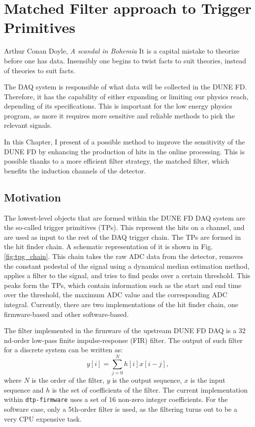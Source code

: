 \chapter{Matched Filter approach to Trigger Primitives}\label{chapter:matched_filter}

\begin{chapquote}{Arthur Conan Doyle, \textit{A scandal in Bohemia}}
	It is a capital mistake to theorize before one has data. Insensibly one begins to twist facts to suit theories, instead of theories to suit facts.
\end{chapquote}

The DAQ system is responsible of what data will be collected in the DUNE FD. Therefore, it has the capability of either expanding or limiting our physics reach, depending of its specifications. This is important for the low energy physics program, as more it requires more sensitive and reliable methods to pick the relevant signals.

In this Chapter, I present of a possible method to improve the sensitivity of the DUNE FD by enhancing the production of hits in the online processing. This is possible thanks to a more efficient filter strategy, the matched filter, which benefits the induction channels of the detector.

\section{Motivation}
\label{sec:matched_filter_motivation}

The lowest-level objects that are formed within the DUNE FD DAQ system are the so-called trigger primitives (TPs). This represent the hits on a channel, and are used as input to the rest of the DAQ trigger chain. The TPs are formed in the hit finder chain. A schematic representation of it is shown in Fig. \ref{fig:tpg_chain}. This chain takes the raw ADC data from the detector, removes the constant pedestal of the signal using a dynamical median estimation method, applies a filter to the signal, and tries to find peaks over a certain threshold. This peaks form the TPs, which contain information such as the start and end time over the threshold, the maximum ADC value and the corresponding ADC integral. Currently, there are two implementations of the hit finder chain, one firmware-based and other software-based.

The filter implemented in the firmware of the upstream DUNE FD DAQ is a $32$nd-order low-pass finite impulse-response (FIR) filter. The output of such filter for a discrete system can be written as:
\begin{equation}\label{2.1.1}
	y[i] = \sum_{j=0}^{N} h[i] x[i-j],
\end{equation}
where $N$ is the order of the filter, $y$ is the output sequence, $x$ is the input sequence and $h$ is the set of coefficients of the filter. The current implementation within \texttt{dtp-firmware} \cite{dtp-firmware} uses a set of 16 non-zero integer coefficients. For the software case, only a 5th-order filter is used, as the filtering turns out to be a very CPU expensive task.

